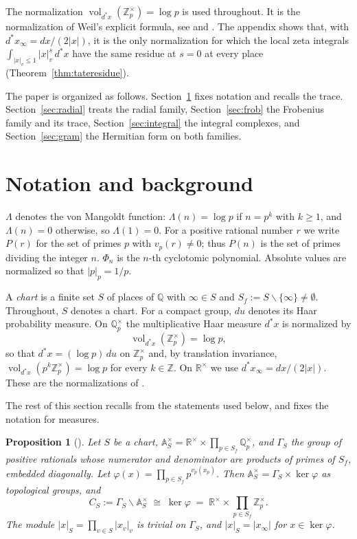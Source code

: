 \documentclass[11pt]{amsart}
\newtheorem{proposition}[theorem]{Proposition}
\theoremstyle{definition}
\newcommand{\R}{\mathbb R}
\newcommand{\Z}{\mathbb Z}
\newcommand{\Q}{\mathbb Q}
\newcommand{\A}{\mathbb A}
\newcommand{\vol}{\operatorname{vol}}
\begin{document}
The normalization $\vol_{d^*x}(\Z_p^\times)=\log p$ is used throughout. It is
the normalization of Weil's explicit formula, see \cite{BurnolSimple} and
\cite[Section~V]{Connes99}. The appendix shows that, with
$d^*x_\infty=dx/(2|x|)$, it is the only normalization for which the local
zeta integrals $\int_{|x|_v\le1}|x|_v^s\,d^*x$ have the same residue at $s=0$
at every place (Theorem~\ref{thm:tateresidue}).

The paper is organized as follows. Section~\ref{sec:prelim} fixes notation
and recalls the trace. Section~\ref{sec:radial} treats the radial family,
Section~\ref{sec:frob} the Frobenius family and its trace,
Section~\ref{sec:integral} the integral complexes, and
Section~\ref{sec:gram} the Hermitian form on both families.

\section{Notation and background}\label{sec:prelim}

$\Lambda$ denotes the von Mangoldt function: $\Lambda(n)=\log p$ if $n=p^k$
with $k\ge1$, and $\Lambda(n)=0$ otherwise, so $\Lambda(1)=0$. For a positive
rational number $r$ we write $P(r)$ for the set of primes $p$ with
$v_p(r)\ne0$; thus $P(n)$ is the set of primes dividing the integer $n$.
$\Phi_n$ is the $n$-th cyclotomic polynomial. Absolute values are normalized
so that $|p|_p=1/p$.

A \emph{chart} is a finite set $S$ of places of $\Q$ with $\infty\in S$ and
$S_f:=S\smallsetminus\{\infty\}\ne\emptyset$. Throughout, $S$ denotes a
chart. For a compact group, $du$
denotes its Haar probability measure. On $\Q_p^\times$ the multiplicative
Haar measure $d^*x$ is normalized by
\begin{equation}\label{eq:shellvol}
   \vol_{d^*x}(\Z_p^\times)=\log p ,
\end{equation}
so that $d^*x=(\log p)\,du$ on $\Z_p^\times$ and, by translation invariance,
$\vol_{d^*x}(p^k\Z_p^\times)=\log p$ for every $k\in\Z$. On $\R^\times$ we use
$d^*x_\infty=dx/(2|x|)$. These are the normalizations of
\cite[(9) and Definition~5.4]{Companion}.

The rest of this section recalls from \cite{Companion} the statements used
below, and fixes the notation for measures.

\begin{proposition}[{\cite[Lemmas~2.1 and~2.3]{Companion}}]
\label{prop:splitting}
Let $S$ be a chart, $\A_S^\times=\R^\times\times\prod_{p\in S_f}\Q_p^\times$,
and $\Gamma_S$ the group of positive rationals whose numerator and denominator
are products of primes of $S_f$, embedded diagonally. Let
$\varphi(x)=\prod_{p\in S_f}p^{v_p(x_p)}$. Then
$\A_S^\times=\Gamma_S\times\ker\varphi$ as topological groups, and
\[
  C_S:=\Gamma_S\backslash\A_S^\times\;\cong\;\ker\varphi
   \;=\;\R^\times\times\prod_{p\in S_f}\Z_p^\times .
\]
The module $|x|_S=\prod_{v\in S}|x_v|_v$ is trivial on $\Gamma_S$, and
$|x|_S=|x_\infty|$ for $x\in\ker\varphi$.
\end{proposition}
\end{document}
